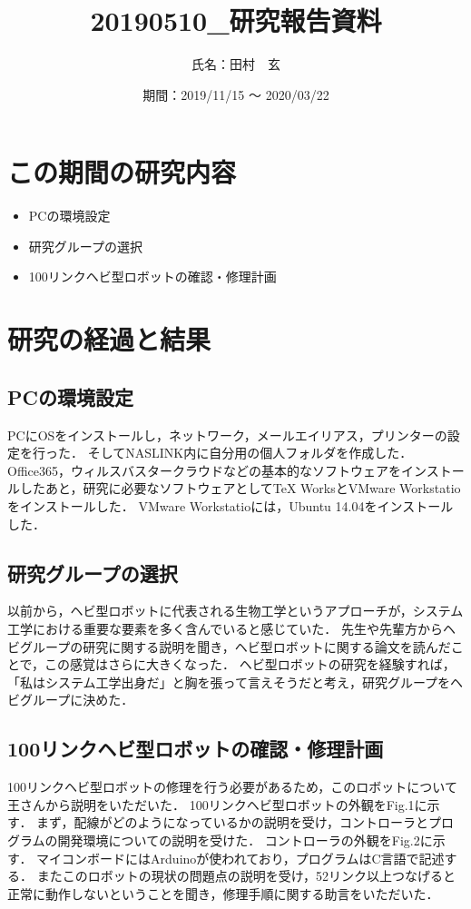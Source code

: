 \documentclass[a4j]{jarticle}
\title{20190510\_研究報告資料}
\author{氏名：田村　玄}
\date{期間：2019/11/15 ～ 2020/03/22}
\def\tightlist{\itemsep1pt\parskip0pt\parsep0pt}
\begin{document}
\maketitle

\section{この期間の研究内容}

\begin{itemize}
\tightlist
\item
  PCの環境設定
\item
  研究グループの選択
\item
  100リンクヘビ型ロボットの確認・修理計画
\end{itemize}

\section{研究の経過と結果}

\subsection{PCの環境設定}

PCにOSをインストールし，ネットワーク，メールエイリアス，プリンターの設定を行った．
そしてNASLINK内に自分用の個人フォルダを作成した．
Office365，ウィルスバスタークラウドなどの基本的なソフトウェアをインストールしたあと，研究に必要なソフトウェアとしてTeX
WorksとVMware Workstatioをインストールした． VMware
Workstatioには，Ubuntu 14.04をインストールした．

\subsection{研究グループの選択}

以前から，ヘビ型ロボットに代表される生物工学というアプローチが，システム工学における重要な要素を多く含んでいると感じていた．
先生や先輩方からヘビグループの研究に関する説明を聞き，ヘビ型ロボットに関する論文を読んだことで，この感覚はさらに大きくなった．
ヘビ型ロボットの研究を経験すれば，「私はシステム工学出身だ」と胸を張って言えそうだと考え，研究グループをヘビグループに決めた．

\subsection{100リンクヘビ型ロボットの確認・修理計画}

100リンクヘビ型ロボットの修理を行う必要があるため，このロボットについて王さんから説明をいただいた．
100リンクヘビ型ロボットの外観をFig.1に示す．
まず，配線がどのようになっているかの説明を受け，コントローラとプログラムの開発環境についての説明を受けた．
コントローラの外観をFig.2に示す．
マイコンボードにはArduinoが使われており，プログラムはC言語で記述する．
またこのロボットの現状の問題点の説明を受け，52リンク以上つなげると正常に動作しないということを聞き，修理手順に関する助言をいただいた．
\end{document}
